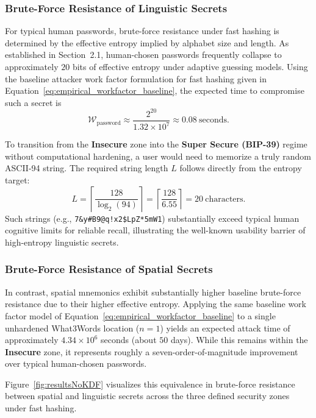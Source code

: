 \documentclass[journal,article,submit,pdftex,moreauthors]{Definitions/mdpi}
\begin{document}
\subsubsection{Brute-Force Resistance of Linguistic Secrets}

For typical human passwords, brute-force resistance under fast hashing is determined by the effective entropy implied by alphabet size and length. As established in Section~2.1, human-chosen passwords frequently collapse to approximately $20$ bits of effective entropy under adaptive guessing models. Using the baseline attacker work factor formulation for fast hashing given in Equation~\ref{eq:empirical_workfactor_baseline}, the expected time to compromise such a secret is
\begin{equation}
\mathcal{W}_{\text{password}} \approx \frac{2^{20}}{1.32 \times 10^7} \approx 0.08 \ \text{seconds}.
\end{equation}

To transition from the \textbf{Insecure} zone into the \textbf{Super Secure (BIP-39)} regime without computational hardening, a user would need to memorize a truly random ASCII-94 string. The required string length $L$ follows directly from the entropy target:
\begin{equation}
L = \left\lceil \frac{128}{\log_2(94)} \right\rceil = \left\lceil \frac{128}{6.55} \right\rceil = 20 \ \text{characters}.
\end{equation}
Such strings (e.g., \texttt{7\&y\#B9@q!x2\$LpZ*5mW1}) substantially exceed typical human cognitive limits for reliable recall, illustrating the well-known usability barrier of high-entropy linguistic secrets.

\subsubsection{Brute-Force Resistance of Spatial Secrets}

In contrast, spatial mnemonics exhibit substantially higher baseline brute-force resistance due to their higher effective entropy. Applying the same baseline work factor model of Equation~\ref{eq:empirical_workfactor_baseline} to a single unhardened What3Words location ($n=1$) yields an expected attack time of approximately $4.34 \times 10^{6}$ seconds (about $50$ days). While this remains within the \textbf{Insecure} zone, it represents roughly a seven-order-of-magnitude improvement over typical human-chosen passwords.

Figure~\ref{fig:resultsNoKDF} visualizes this equivalence in brute-force resistance between spatial and linguistic secrets across the three defined security zones under fast hashing.
\end{document}
